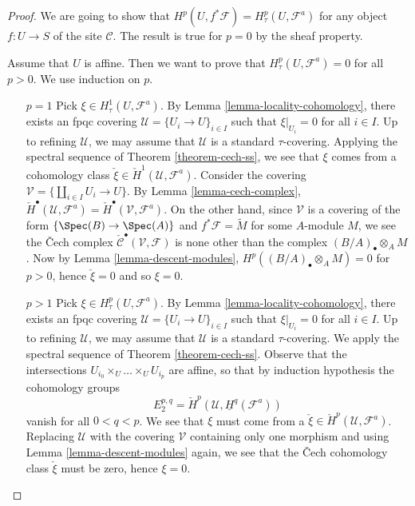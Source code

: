 \begin{proof}
We are going to show that
$H^p(U, f^*\mathcal{F}) = H^p_\tau(U, \mathcal{F}^a)$
for any object $f : U \to S$ of the site $\mathcal{C}$.
The result is true for $p = 0$ by the sheaf property.

\medskip\noindent
Assume that $U$ is affine. Then we want to prove that
$H^p_\tau(U, \mathcal{F}^a) = 0$ for all $p > 0$. We use induction on $p$.
\begin{enumerate}
\item[$p = 1$]
Pick $\xi \in H^1_\tau(U, \mathcal{F}^a)$.
By Lemma \ref{lemma-locality-cohomology},
there exists an fpqc covering $\mathcal{U} = \{U_i \to U\}_{i \in I}$
such that $\xi|_{U_i} = 0$ for all $i \in I$. Up to refining
$\mathcal{U}$, we may assume that $\mathcal{U}$ is a standard
$\tau$-covering. Applying the spectral sequence of
Theorem \ref{theorem-cech-ss},
we see that $\xi$ comes from a cohomology class
$\check \xi \in \check H^1(\mathcal{U}, \mathcal{F}^a)$.
Consider the covering $\mathcal{V} = \{\coprod_{i\in I} U_i \to U\}$. By
Lemma \ref{lemma-cech-complex},
$\check H^\bullet(\mathcal{U}, \mathcal{F}^a) =
\check H^\bullet(\mathcal{V}, \mathcal{F}^a)$.
On the other hand, since $\mathcal{V}$ is a covering of the form
$\{\Spec(B) \to \Spec(A)\}$ and $f^*\mathcal{F} = \widetilde{M}$
for some $A$-module $M$, we see the {\v C}ech complex
$\check{\mathcal{C}}^\bullet(\mathcal{V}, \mathcal{F})$
is none other than the complex $(B/A)_\bullet \otimes_A M$.
Now by Lemma \ref{lemma-descent-modules},
$H^p((B/A)_\bullet \otimes_A M) = 0$ for $p>0$, hence $\check \xi = 0$
and so $\xi = 0$.
\item[$p > 1$]
Pick $\xi \in H^p_\tau(U, \mathcal{F}^a)$. By
Lemma \ref{lemma-locality-cohomology},
there exists an fpqc covering $\mathcal{U} = \{U_i \to U\}_{i \in I}$
such that $\xi|_{U_i} = 0$ for all $i \in I$. Up to refining
$\mathcal{U}$, we may assume that $\mathcal{U}$ is a standard
$\tau$-covering. We apply the spectral sequence of
Theorem \ref{theorem-cech-ss}.
Observe that the intersections $U_{i_0} \times_U \ldots \times_U U_{i_p}$
are affine, so that by induction hypothesis the cohomology groups
$$
E_2^{p, q} = \check H^p(\mathcal{U}, \underline{H}^q(\mathcal{F}^a))
$$
vanish for all $0 < q < p$. We see that $\xi$ must come from a
$\check \xi \in \check H^p(\mathcal{U}, \mathcal{F}^a)$. Replacing
$\mathcal{U}$ with the covering $\mathcal{V}$ containing only one morphism
and using Lemma \ref{lemma-descent-modules} again,
we see that the {\v C}ech cohomology class $\check \xi$ must be zero,
hence $\xi = 0$.

\end{enumerate}
\end{proof}
